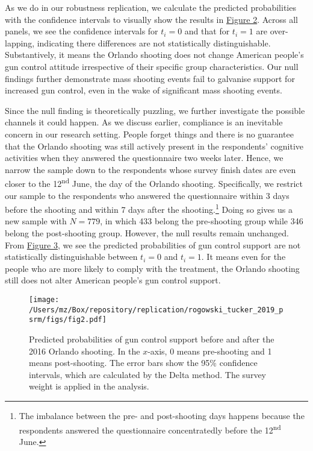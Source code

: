 \documentclass[11pt]{article}
\begin{document}
As we do in our robustness replication, we calculate the predicted probabilities with the confidence intervals to visually show the results in \hyperref[fig2]{Figure 2}. Across all panels, we see the confidence intervals for \(t_i = 0\) and that for \(t_i = 1\) are over-lapping, indicating there differences are not statistically distinguishable. Substantively, it means the Orlando shooting does not change American people’s gun control attitude irrespective of their specific group characteristics. Our null findings further demonstrate mass shooting events fail to galvanise support for increased gun control, even in the wake of significant mass shooting events.

Since the null finding is theoretically puzzling, we further investigate the possible channels it could happen. As we discuss earlier, compliance is an inevitable concern in our research setting. People forget things and there is no guarantee that the Orlando shooting was still actively present in the respondents’ cognitive activities when they answered the questionnaire two weeks later. Hence, we narrow the sample down to the respondents whose survey finish dates are even closer to the 12\textsuperscript{nd} June, the day of the Orlando shooting. Specifically, we restrict our sample to the respondents who answered the questionnaire within 3 days before the shooting and within 7 days after the shooting.\footnote{The imbalance between the pre- and post-shooting days happens because the respondents answered the questionnaire concentratedly before the 12\textsuperscript{nd} June.} Doing so gives us a new sample with \(N = 779\), in which 433 belong the pre-shooting group while 346 belong the post-shooting group. However, the null results remain unchanged. From \hyperref[fig3]{Figure 3}, we see the predicted probabilities of gun control support are not statistically distinguishable between \(t_i = 0\) and \(t_i = 1\). It means even for the people who are more likely to comply with the treatment, the Orlando shooting still does not alter American people’s gun control support.
\begin{figure}[htbp!]
    \centering
    \label{fig2}
    \texttt{[image: /Users/mz/Box/repository/replication/rogowski\_tucker\_2019\_psrm/figs/fig2.pdf]}
    \captionsetup{justification = raggedright, singlelinecheck = false}
    \caption{Predicted probabilities of gun control support before and after the 2016 Orlando shooting. In the \(x\)-axis, 0 means pre-shooting and 1 means post-shooting. The error bars show the 95\% confidence intervals, which are calculated by the Delta method. The survey weight is applied in the analysis.}
\end{figure}
\end{document}
